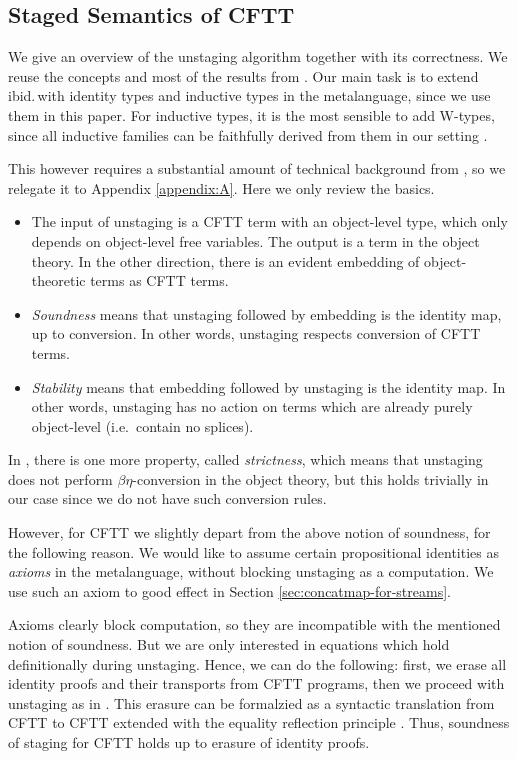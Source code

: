\documentclass[acmsmall,screen,review,anonymous]{acmart}
\theoremstyle{remark}
\begin{document}
\subsection{Staged Semantics of CFTT}\label{sec:semantics-of-staging}

We give an overview of the unstaging algorithm together with its correctness.
We reuse the concepts and most of the results from \cite{staged2ltt}. Our main
task is to extend ibid.\,with identity types and inductive types in the
metalanguage, since we use them in this paper. For inductive types, it is the
most sensible to add W-types, since all inductive families can be faithfully
derived from them in our setting \cite{whynotw}.

This however requires a substantial amount of technical background from
\cite{staged2ltt}, so we relegate it to Appendix \ref{appendix:A}. Here we only
review the basics.
\begin{itemize}
\item The input of unstaging is a CFTT term with an object-level type, which
      only depends on object-level free variables. The output is a term in the
      object theory. In the other direction, there is an evident embedding of
      object-theoretic terms as CFTT terms.
\item \emph{Soundness} means that unstaging followed by embedding is the
      identity map, up to conversion. In other words, unstaging respects conversion
      of CFTT terms.
\item \emph{Stability} means that embedding followed by unstaging is the
      identity map. In other words, unstaging has no action on terms which are
      already purely object-level (i.e.\ contain no splices).
\end{itemize}
In \cite{staged2ltt}, there is one more property, called \emph{strictness},
which means that unstaging does not perform $\beta\eta$-conversion in the
object theory, but this holds trivially in our case since we do not have such
conversion rules.

However, for CFTT we slightly depart from the above notion of soundness, for the
following reason. We would like to assume certain propositional identities as
\emph{axioms} in the metalanguage, without blocking unstaging as a
computation. We use such an axiom to good effect in Section
\ref{sec:concatmap-for-streams}.

Axioms clearly block computation, so they are incompatible with the mentioned
notion of soundness. But we are only interested in equations which hold
definitionally during unstaging. Hence, we can do the following: first, we erase
all identity proofs and their transports from CFTT programs, then we proceed
with unstaging as in \cite{staged2ltt}. This erasure can be formalzied as a
syntactic translation \cite{next700} from CFTT to CFTT extended with the
equality reflection principle \cite{TODO}. Thus, soundness of staging for CFTT
holds up to erasure of identity proofs.
\end{document}
